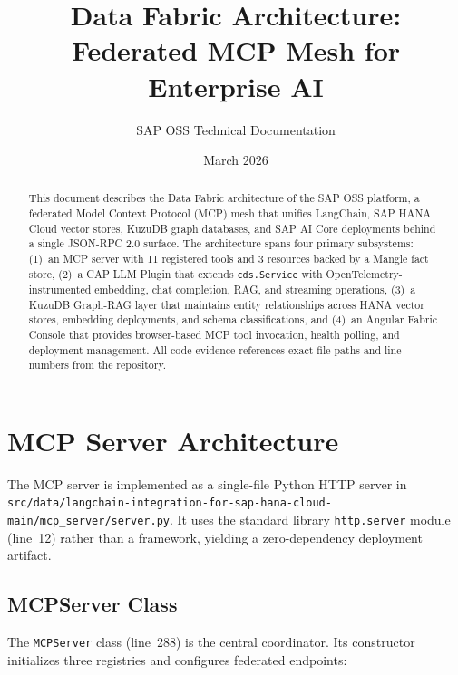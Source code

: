 \documentclass[11pt]{article}
\title{Data Fabric Architecture:\\Federated MCP Mesh for Enterprise AI}
\author{SAP OSS Technical Documentation}
\date{March 2026}
\newcommand{\filepath}[1]{\texttt{#1}}
\newcommand{\code}[1]{\texttt{#1}}
\begin{document}
\maketitle

\begin{abstract}
This document describes the Data Fabric architecture of the SAP OSS platform,
a federated Model Context Protocol (MCP) mesh that unifies LangChain,
SAP HANA Cloud vector stores, KuzuDB graph databases, and SAP AI Core
deployments behind a single JSON-RPC 2.0 surface.  The architecture spans
four primary subsystems: (1)~an MCP server with 11 registered tools and 3
resources backed by a Mangle fact store, (2)~a CAP LLM Plugin that
extends \code{cds.Service} with OpenTelemetry-instrumented embedding,
chat completion, RAG, and streaming operations, (3)~a KuzuDB Graph-RAG
layer that maintains entity relationships across HANA vector stores,
embedding deployments, and schema classifications, and (4)~an Angular
Fabric Console that provides browser-based MCP tool invocation, health
polling, and deployment management.  All code evidence references exact
file paths and line numbers from the repository.
\end{abstract}

\tableofcontents
\newpage

\section{MCP Server Architecture}
\label{sec:mcp-server}

The MCP server is implemented as a single-file Python HTTP server in
\filepath{src/data/langchain-integration-for-sap-hana-cloud-main/mcp\_server/server.py}.
It uses the standard library \code{http.server} module (line~12) rather than
a framework, yielding a zero-dependency deployment artifact.

\subsection{MCPServer Class}

The \code{MCPServer} class (line~288) is the central coordinator.  Its constructor
initializes three registries and configures federated endpoints:
\end{document}

